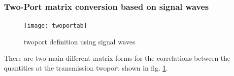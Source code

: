 \subsubsection{Two-Port matrix conversion based on signal waves}

\begin{figure}[ht]
\begin{center}
\texttt{[image: twoportab]}
\end{center}
\caption{twoport definition using signal waves}
\label{fig:twoportab}
\end{figure}
\FloatBarrier

There are two main different matrix forms for the correlations between the
quantities at the transmission twoport shown in
fig. \ref{fig:twoportab}.


